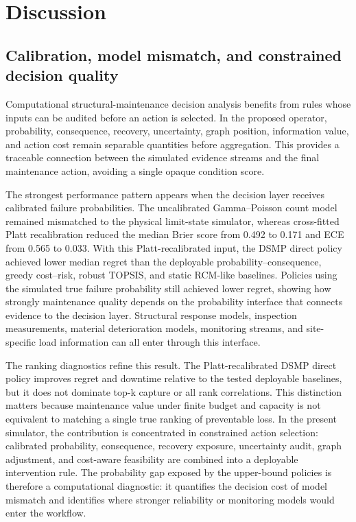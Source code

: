 \documentclass[cmes,article,submit,moreauthors,pdftex]{Definitions/tsp}
\begin{document}
\clearpage

\section{Discussion}

\subsection{Calibration, model mismatch, and constrained decision quality}

Computational structural-maintenance decision analysis benefits from rules whose inputs can be audited before an action is selected. In the proposed operator, probability, consequence, recovery, uncertainty, graph position, information value, and action cost remain separable quantities before aggregation. This provides a traceable connection between the simulated evidence streams and the final maintenance action, avoiding a single opaque condition score.

The strongest performance pattern appears when the decision layer receives calibrated failure probabilities. The uncalibrated Gamma--Poisson count model remained mismatched to the physical limit-state simulator, whereas cross-fitted Platt recalibration reduced the median Brier score from 0.492 to 0.171 and ECE from 0.565 to 0.033. With this Platt-recalibrated input, the DSMP direct policy achieved lower median regret than the deployable probability--consequence, greedy cost--risk, robust TOPSIS, and static RCM-like baselines. Policies using the simulated true failure probability still achieved lower regret, showing how strongly maintenance quality depends on the probability interface that connects evidence to the decision layer. Structural response models, inspection measurements, material deterioration models, monitoring streams, and site-specific load information can all enter through this interface.

The ranking diagnostics refine this result. The Platt-recalibrated DSMP direct policy improves regret and downtime relative to the tested deployable baselines, but it does not dominate top-k capture or all rank correlations. This distinction matters because maintenance value under finite budget and capacity is not equivalent to matching a single true ranking of preventable loss. In the present simulator, the contribution is concentrated in constrained action selection: calibrated probability, consequence, recovery exposure, uncertainty audit, graph adjustment, and cost-aware feasibility are combined into a deployable intervention rule. The probability gap exposed by the upper-bound policies is therefore a computational diagnostic: it quantifies the decision cost of model mismatch and identifies where stronger reliability or monitoring models would enter the workflow.
\end{document}
